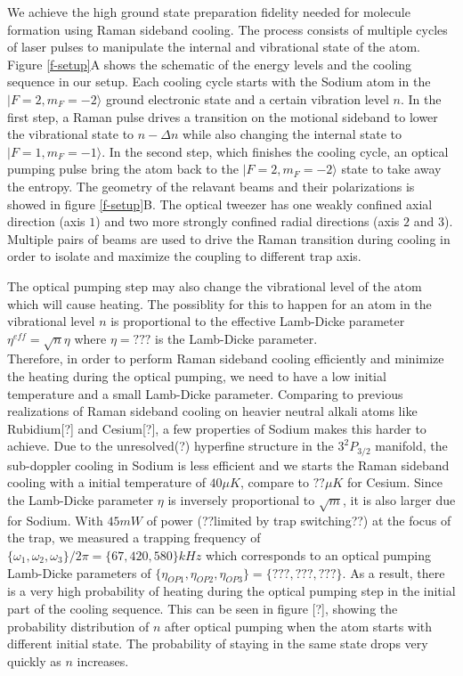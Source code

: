 \documentclass[aps,prl,twocolumn,groupedaddress]{revtex4-1}
\begin{document}
We achieve the high ground state preparation fidelity needed for molecule formation
using Raman sideband cooling. The process consists of multiple cycles of laser pulses
to manipulate the internal and vibrational state of the atom.
Figure \ref{f-setup}A shows the schematic of the energy levels and the cooling sequence
in our setup.
Each cooling cycle starts with the Sodium atom in the $|F=2, m_F=-2\rangle$
ground electronic state and a certain vibration level $n$.
In the first step, a Raman pulse drives a transition on the motional sideband to lower
the vibrational state to $n-\Delta n$ while also changing the internal state
to $|F=1, m_F=-1\rangle$.
In the second step, which finishes the cooling cycle,
an optical pumping pulse bring the atom back to the $|F=2, m_F=-2\rangle$ state to take away
the entropy.
The geometry of the relavant beams and their polarizations is showed in figure \ref{f-setup}B.
The optical tweezer has one weakly confined axial direction (axis $1$) and
two more strongly confined radial directions (axis $2$ and $3$).
Multiple pairs of beams are used to drive the Raman transition during cooling in order to
isolate and maximize the coupling to different trap axis.

The optical pumping step may also change the vibrational level of the atom which
will cause heating. The possiblity for this to happen for an atom in the vibrational level $n$
is proportional to the effective Lamb-Dicke parameter $\eta^{eff}=\sqrt{n}\eta$ where $\eta=???$ is the Lamb-Dicke parameter.\\

Therefore, in order to perform Raman sideband cooling efficiently and minimize the heating during the optical pumping, we need to have a low initial temperature and a small Lamb-Dicke parameter. Comparing to previous realizations of Raman sideband cooling on heavier neutral alkali atoms like Rubidium[?] and Cesium[?], a few properties of Sodium makes this harder to achieve. Due to the unresolved(?) hyperfine structure in the $3^2P_{3/2}$ manifold, the sub-doppler cooling in Sodium is less efficient and we starts the Raman sideband cooling with a initial temperature of $40\mu K$, compare to $??\mu K$ for Cesium. Since the Lamb-Dicke parameter $\eta$ is inversely proportional to $\sqrt{m}$, it is also larger due for Sodium. With $45mW$ of power (??limited by trap switching??) at the focus of the trap, we measured a trapping frequency of $\{\omega_1,\omega_2,\omega_3\}/2\pi = \{67, 420, 580\} kHz$ which corresponds to an optical pumping Lamb-Dicke parameters of $\{\eta_{OP1},\eta_{OP2},\eta_{OP3}\} = \{???, ???, ???\}$. As a result, there is a very high probability of heating during the optical pumping step in the initial part of the cooling sequence.
This can be seen in figure [?], showing the probability distribution
of $n$ after optical pumping when the atom starts with different initial state. The probability
of staying in the same state drops very quickly as $n$ increases.\\
\end{document}
